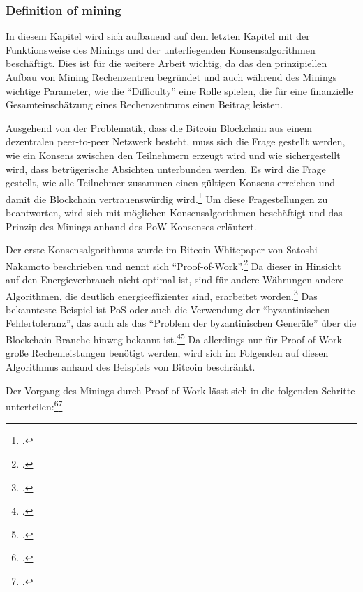 \subsubsection{Definition of mining} \label{toc:miningundkonsensalgorithmen}

In diesem Kapitel wird sich aufbauend auf dem letzten Kapitel mit der Funktionsweise des Minings und der unterliegenden
Konsensalgorithmen beschäftigt. Dies ist für die weitere Arbeit wichtig, da das den prinzipiellen Aufbau von Mining
Rechenzentren begründet und auch während des Minings wichtige Parameter, wie die "`Difficulty"' eine Rolle spielen, die
für eine finanzielle Gesamteinschätzung eines Rechenzentrums einen Beitrag leisten.

Ausgehend von der Problematik, dass die Bitcoin Blockchain aus einem dezentralen peer-to-peer Netzwerk besteht, muss
sich die Frage gestellt werden, wie ein Konsens zwischen den Teilnehmern erzeugt wird und wie sichergestellt wird,
dass betrügerische Absichten unterbunden werden. Es wird die Frage gestellt, wie alle Teilnehmer zusammen einen gültigen
Konsens erreichen und damit die Blockchain vertrauenswürdig wird.\footcite[Cf.][Fig. 3]{derks2018chaining}
Um diese Fragestellungen zu beantworten, wird sich mit möglichen Konsensalgorithmen beschäftigt und das Prinzip
des Minings anhand des \ac{PoW} Konsenses erläutert.

Der erste Konsensalgorithmus wurde im Bitcoin Whitepaper von Satoshi Nakamoto beschrieben und nennt sich
"`Proof-of-Work"'.\footcite[Cf.][p. 3]{nakamoto2008bitcoin} Da dieser in Hinsicht auf den Energieverbrauch nicht
optimal ist, sind für andere Währungen andere Algorithmen, die deutlich energieeffizienter sind, erarbeitet
worden.\footcite[Cf.][]{dwcom2021bitcoin} Das bekannteste Beispiel ist \ac{PoS} oder auch die Verwendung der
"`byzantinischen Fehlertoleranz"', das auch als das "`Problem der byzantinischen Generäle"' über die Blockchain
Branche hinweg bekannt ist.\footcite[Cf.][p. 2]{friedlmaier2018disrupting}\footcite[Cf.][p. 746]{mukhopadhyay2016brief}
Da allerdings nur für Proof-of-Work große Rechenleistungen benötigt werden, wird sich im Folgenden auf diesen Algorithmus
anhand des Beispiels von Bitcoin beschränkt.

Der Vorgang des Minings durch Proof-of-Work lässt sich in die folgenden Schritte
unterteilen:\footcite[Cf.][p. 3]{nakamoto2008bitcoin}\footcite[Cf.][p. 51]{li2019blockchain}

